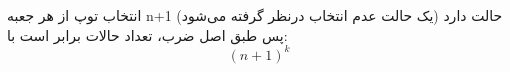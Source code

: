 \p
انتخاب توپ از هر جعبه n+1 حالت دارد 
(یک حالت عدم انتخاب درنظر گرفته می‌شود)
پس طبق اصل ضرب، تعداد حالات برابر است با:
$$(n+1)^k$$   